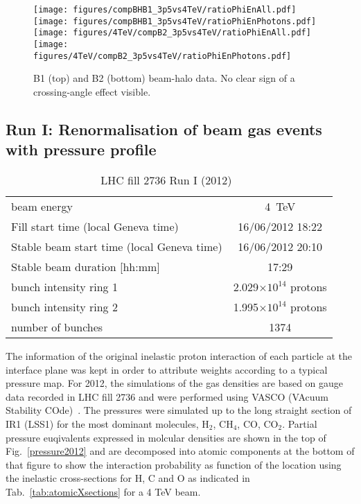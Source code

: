 \begin{figure}
\begin{center}
  \texttt{[image: figures/compBHB1\_3p5vs4TeV/ratioPhiEnAll.pdf]}
  \texttt{[image: figures/compBHB1\_3p5vs4TeV/ratioPhiEnPhotons.pdf]}
  \texttt{[image: figures/4TeV/compB2\_3p5vs4TeV/ratioPhiEnAll.pdf]}
  \texttt{[image: figures/4TeV/compB2\_3p5vs4TeV/ratioPhiEnPhotons.pdf]}
\end{center}
\vspace{-0.6cm}
\caption{B1 (top) and B2 (bottom) beam-halo data. No clear sign of a crossing-angle effect visible.
  \label{xingCompBH}}
\end{figure}


\subsection{Run I: Renormalisation of beam gas events with pressure profile}

\begin{table}
   \centering
   \caption{LHC fill 2736 Run I (2012)~\cite{refAccStats}}
   \begin{tabular}{l||c}
       \hline
       beam energy  & 4~TeV \\
       Fill start time (local Geneva time) & 16/06/2012 18:22\\
       Stable beam start time (local Geneva time) & 16/06/2012 20:10\\
       Stable beam duration [hh:mm] & 17:29\\
       bunch intensity ring 1& 2.029$\times 10^{14}$ protons\\
       bunch intensity ring 2& 1.995$\times 10^{14}$ protons\\
       number of bunches & 1374 \\
       \hline
   \end{tabular}
   \label{tab:fillRunI}
\end{table}

The information of the original inelastic proton interaction of each particle at the interface plane was kept in order to attribute weights according to a typical pressure map. For 2012, the simulations of the gas densities are based on gauge data recorded in LHC fill 2736 and were performed using VASCO (VAcuum Stability COde)~\cite{vascoRef}. The pressures were simulated up to the long straight section of IR1 (LSS1) for the most dominant molecules, H$_2$, CH$_4$, CO, CO$_2$. Partial pressure euqivalents expressed in molcular densities are shown in the top of Fig.~\ref{pressure2012} and are decomposed into atomic components at the bottom of that figure to show the interaction probability as function of the location using the inelastic cross-sections for H, C and O as indicated in Tab.~\ref{tab:atomicXsections} for a 4 TeV beam.

